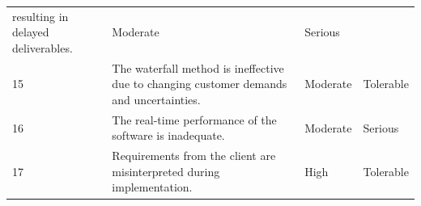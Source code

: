 \documentclass[]{article}
\begin{document}
\begin{longtable}[c]{@{}llll@{}}
\begin{minipage}[t]{0.22\columnwidth}
resulting in delayed deliverables.
\end{minipage} & \begin{minipage}[t]{0.22\columnwidth}\raggedright
Moderate
\end{minipage} & \begin{minipage}[t]{0.22\columnwidth}\raggedright
Serious
\end{minipage}
\\\addlinespace
\begin{minipage}[t]{0.22\columnwidth}\raggedright
15
\end{minipage} & \begin{minipage}[t]{0.22\columnwidth}\raggedright
The waterfall method is ineffective due to changing customer demands and
uncertainties.
\end{minipage} & \begin{minipage}[t]{0.22\columnwidth}\raggedright
Moderate
\end{minipage} & \begin{minipage}[t]{0.22\columnwidth}\raggedright
Tolerable
\end{minipage}
\\\addlinespace
\begin{minipage}[t]{0.22\columnwidth}\raggedright
16
\end{minipage} & \begin{minipage}[t]{0.22\columnwidth}\raggedright
The real-time performance of the software is inadequate.
\end{minipage} & \begin{minipage}[t]{0.22\columnwidth}\raggedright
Moderate
\end{minipage} & \begin{minipage}[t]{0.22\columnwidth}\raggedright
Serious
\end{minipage}
\\\addlinespace
\begin{minipage}[t]{0.22\columnwidth}\raggedright
17
\end{minipage} & \begin{minipage}[t]{0.22\columnwidth}\raggedright
Requirements from the client are misinterpreted during implementation.
\end{minipage} & \begin{minipage}[t]{0.22\columnwidth}\raggedright
High
\end{minipage} & \begin{minipage}[t]{0.22\columnwidth}\raggedright
Tolerable
\end{minipage}

\end{longtable}
\end{document}
